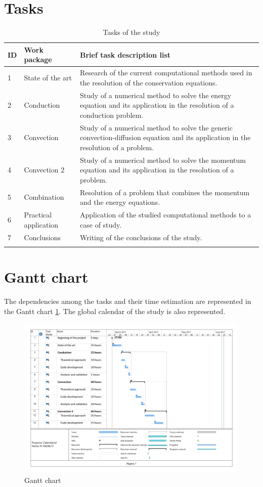 \section{Tasks}
\begin{longtable}{ | p{1.3cm} | p{3cm} | p{11cm} |}
	\hline
	\textbf{ID} & \textbf{Work package} & \textbf{Brief task description list} \\ \hline
	1 & State of the art & Research of the current computational methods used in the resolution of the conservation equations. \\ \hline
	2 & Conduction & Study of a numerical method to solve the energy equation and its application in the resolution of a conduction problem. \\ \hline
	3 & Convection & Study of a numerical method to solve the generic convection-diffusion equation and its application in the resolution of a problem. \\ \hline
	4 & Convection 2 & Study of a numerical method to solve the momentum equation and its application in the resolution of a problem. \\ \hline
	5 & Combination & Resolution of a problem that combines the momentum and the energy equations. \\ \hline
	6 & Practical application & Application of the studied computational methods to a case of study. \\ \hline
	7 & Conclusions & Writing of the conclusions of the study. \\ \hline
	\caption{Tasks of the study}
\end{longtable}

\pagebreak
\section{Gantt chart}
The dependencies among the tasks and their time estimation are represented in the Gantt chart \ref{Gantt}. The global calendar of the study is also represented.
\begin{figure}[H]
	\centering
	\includegraphics[scale=0.5]{Calendariv2}
	\caption{Gantt chart}
	\label{Gantt}
\end{figure}

